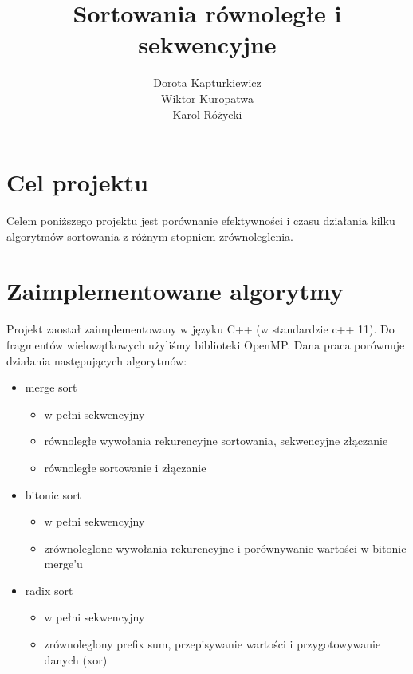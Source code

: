 \documentclass[11pt]{article}
\title{\textbf{Sortowania równoległe i sekwencyjne}}
\author{Dorota Kapturkiewicz\\
		Wiktor Kuropatwa\\
		Karol Różycki}
\date{}
\begin{document}
\maketitle

\section{Cel projektu}
Celem poniższego projektu jest porównanie efektywności i czasu działania kilku algorytmów sortowania z różnym stopniem zrównoleglenia.

\section{Zaimplementowane algorytmy}
Projekt zaostał zaimplementowany w języku C++ (w standardzie c++ 11).
Do fragmentów wielowątkowych użyliśmy biblioteki OpenMP. \newline
Dana praca porównuje działania następujących algorytmów:
\begin{itemize}

\item merge sort 
\begin{itemize}
\item w pełni sekwencyjny 
\item równoległe wywołania rekurencyjne sortowania, sekwencyjne złączanie
\item równoległe sortowanie i złączanie
\end{itemize}

\item bitonic sort
\begin{itemize}
\item w pełni sekwencyjny 
\item zrównoleglone wywołania rekurencyjne i porównywanie wartości w bitonic merge'u
\end{itemize}

\item radix sort
\begin{itemize}
\item w pełni sekwencyjny 
\item zrównoleglony prefix sum, przepisywanie wartości i przygotowywanie danych (xor)
\end{itemize}

\end{itemize}
\end{document}
